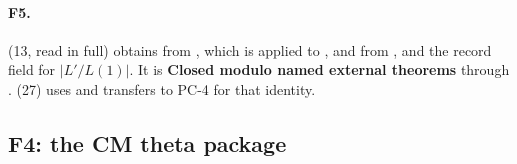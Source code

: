\documentclass[11pt]{article}
\newcommand{\PC}[1]{\textsf{PC-#1}}
\newcommand{\sE}{\textbf{Closed modulo named external theorems}}
\theoremstyle{remark}
\begin{document}
\paragraph{F5.}  (13, read in full) obtains  from , which is  applied to , and from ,  and the record field for $\lvert L'/L(1)\rvert$. It is \sE{} through .  (27) uses  and transfers to \PC{4} for that identity.

\subsection{F4: the CM theta package }\label{sec:fu2f4}
\end{document}
